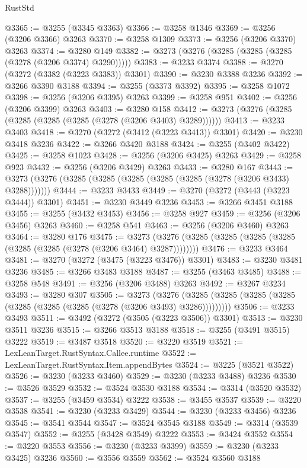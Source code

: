 \begin{lexlean}{RustStd}
\begin{coremodule}
{\begin{coremodule}
{{{{{{{{{{{{{{{{{{{{{{{{{{{{{{{{{{{{{@3365 := @3255 (@3345 @3363)
@3366 := @3258 @1346
@3369 := @3256 (@3206 @3366) @3263
@3370 := @3258 @1309
@3373 := @3256 (@3206 @3370) @3263
@3374 := @3280 @149
@3382 := @3273 (@3276 (@3285 (@3285 (@3285 (@3278 (@3206 @3374) @3290)))))
@3383 := @3233 @3374
@3388 := @3270 (@3272 (@3382 (@3223 @3383)) @3301)
@3390 := @3230 @3388 @3236
@3392 := @3266 @3390 @3188
@3394 := @3255 (@3373 @3392)
@3395 := @3258 @1072
@3398 := @3256 (@3206 @3395) @3263
@3399 := @3258 @951
@3402 := @3256 (@3206 @3399) @3263
@3403 := @3280 @158
@3412 := @3273 (@3276 (@3285 (@3285 (@3285 (@3285 (@3278 (@3206 @3403) @3289))))))
@3413 := @3233 @3403
@3418 := @3270 (@3272 (@3412 (@3223 @3413)) @3301)
@3420 := @3230 @3418 @3236
@3422 := @3266 @3420 @3188
@3424 := @3255 (@3402 @3422)
@3425 := @3258 @1023
@3428 := @3256 (@3206 @3425) @3263
@3429 := @3258 @923
@3432 := @3256 (@3206 @3429) @3263
@3433 := @3280 @167
@3443 := @3273 (@3276 (@3285 (@3285 (@3285 (@3285 (@3285 (@3278 (@3206 @3433) @3288)))))))
@3444 := @3233 @3433
@3449 := @3270 (@3272 (@3443 (@3223 @3444)) @3301)
@3451 := @3230 @3449 @3236
@3453 := @3266 @3451 @3188
@3455 := @3255 (@3432 @3453)
@3456 := @3258 @927
@3459 := @3256 (@3206 @3456) @3263
@3460 := @3258 @541
@3463 := @3256 (@3206 @3460) @3263
@3464 := @3280 @176
@3475 := @3273 (@3276 (@3285 (@3285 (@3285 (@3285 (@3285 (@3285 (@3278 (@3206 @3464) @3287))))))))
@3476 := @3233 @3464
@3481 := @3270 (@3272 (@3475 (@3223 @3476)) @3301)
@3483 := @3230 @3481 @3236
@3485 := @3266 @3483 @3188
@3487 := @3255 (@3463 @3485)
@3488 := @3258 @548
@3491 := @3256 (@3206 @3488) @3263
@3492 := @3267 @3234
@3493 := @3280 @307
@3505 := @3273
    (@3276 (@3285 (@3285 (@3285 (@3285 (@3285 (@3285 (@3285 (@3278 (@3206 @3493) @3286)))))))))
@3506 := @3233 @3493
@3511 := @3492 (@3272 (@3505 (@3223 @3506)) @3301)
@3513 := @3230 @3511 @3236
@3515 := @3266 @3513 @3188
@3518 := @3255 (@3491 @3515) @3222
@3519 := @3487 @3518
@3520 := @3220 @3519
@3521 := LexLeanTarget.RustSyntax.Callee.runtime
@3522 := LexLeanTarget.RustSyntax.Item.appendBytes
@3524 := @3225 (@3521 @3522)
@3526 := @3230 (@3233 @3460)
@3529 := @3230 (@3233 @3488) @3236
@3530 := @3526 @3529
@3532 := @3524 @3530 @3188
@3534 := @3314 (@3520 @3532)
@3537 := @3255 (@3459 @3534) @3222
@3538 := @3455 @3537
@3539 := @3220 @3538
@3541 := @3230 (@3233 @3429)
@3544 := @3230 (@3233 @3456) @3236
@3545 := @3541 @3544
@3547 := @3524 @3545 @3188
@3549 := @3314 (@3539 @3547)
@3552 := @3255 (@3428 @3549) @3222
@3553 := @3424 @3552
@3554 := @3220 @3553
@3556 := @3230 (@3233 @3399)
@3559 := @3230 (@3233 @3425) @3236
@3560 := @3556 @3559
@3562 := @3524 @3560 @3188
}}}}}}}}}}}}}}}}}}}}}}}}}}}}}}}}}}}}}
\end{coremodule}}
\end{coremodule}
\end{lexlean}
